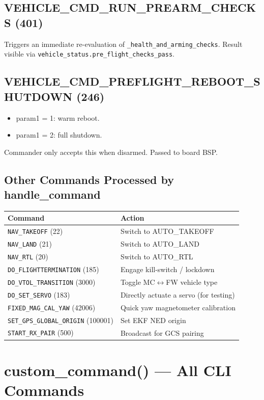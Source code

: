 \documentclass[12pt,a4paper]{article}
\begin{document}
\subsection{VEHICLE\_CMD\_RUN\_PREARM\_CHECKS (401)}
Triggers an immediate re-evaluation of \texttt{\_health\_and\_arming\_checks}.
Result visible via \texttt{vehicle\_status.pre\_flight\_checks\_pass}.

\subsection{VEHICLE\_CMD\_PREFLIGHT\_REBOOT\_SHUTDOWN (246)}
\begin{itemize}
  \item param1 = 1: warm reboot.
  \item param1 = 2: full shutdown.
\end{itemize}
Commander only accepts this when disarmed. Passed to board BSP.

\subsection{Other Commands Processed by handle\_command}
\begin{center}\begin{tabular}{ll}\toprule
Command & Action \\\midrule
\texttt{NAV\_TAKEOFF} (22) & Switch to AUTO\_TAKEOFF \\
\texttt{NAV\_LAND} (21) & Switch to AUTO\_LAND \\
\texttt{NAV\_RTL} (20) & Switch to AUTO\_RTL \\
\texttt{DO\_FLIGHTTERMINATION} (185) & Engage kill-switch / lockdown \\
\texttt{DO\_VTOL\_TRANSITION} (3000) & Toggle MC$\leftrightarrow$FW vehicle type \\
\texttt{DO\_SET\_SERVO} (183) & Directly actuate a servo (for testing) \\
\texttt{FIXED\_MAG\_CAL\_YAW} (42006) & Quick yaw magnetometer calibration \\
\texttt{SET\_GPS\_GLOBAL\_ORIGIN} (100001) & Set EKF NED origin \\
\texttt{START\_RX\_PAIR} (500) & Broadcast for GCS pairing \\
\bottomrule\end{tabular}\end{center}

\section{custom\_command() --- All CLI Commands}
\end{document}
